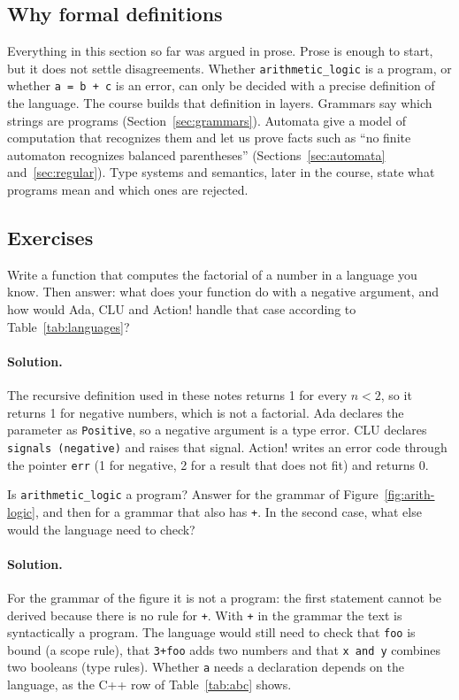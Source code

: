\subsection{Why formal definitions}

Everything in this section so far was argued in prose. Prose is enough to
start, but it does not settle disagreements. Whether \texttt{arithmetic\_logic}
is a program, or whether \texttt{a = b + c} is an error, can only be decided
with a precise definition of the language. The course builds that definition
in layers. Grammars say which strings are programs (Section~\ref{sec:grammars}).
Automata give a model of computation that recognizes them and let us prove
facts such as ``no finite automaton recognizes balanced parentheses''
(Sections~\ref{sec:automata} and~\ref{sec:regular}). Type systems and
semantics, later in the course, state what programs mean and which ones are
rejected.

\subsection{Exercises}

\begin{exercise}
Write a function that computes the factorial of a number in a language you
know. Then answer: what does your function do with a negative argument, and
how would Ada, CLU and Action! handle that case according to
Table~\ref{tab:languages}?
\end{exercise}

\paragraph{Solution.} The recursive definition used in these notes returns 1
for every $n < 2$, so it returns 1 for negative numbers, which is not a
factorial. Ada declares the parameter as \texttt{Positive}, so a negative
argument is a type error. CLU declares \texttt{signals (negative)} and raises
that signal. Action! writes an error code through the pointer \texttt{err}
(1 for negative, 2 for a result that does not fit) and returns 0.

\begin{exercise}
Is \texttt{arithmetic\_logic} a program? Answer for the grammar of
Figure~\ref{fig:arith-logic}, and then for a grammar that also has
\texttt{+}. In the second case, what else would the language need to check?
\end{exercise}

\paragraph{Solution.} For the grammar of the figure it is not a program: the
first statement cannot be derived because there is no rule for \texttt{+}.
With \texttt{+} in the grammar the text is syntactically a program. The
language would still need to check that \texttt{foo} is bound (a scope rule),
that \texttt{3+foo} adds two numbers and that \texttt{x and y} combines two
booleans (type rules). Whether \texttt{a} needs a declaration depends on the
language, as the C++ row of Table~\ref{tab:abc} shows.

